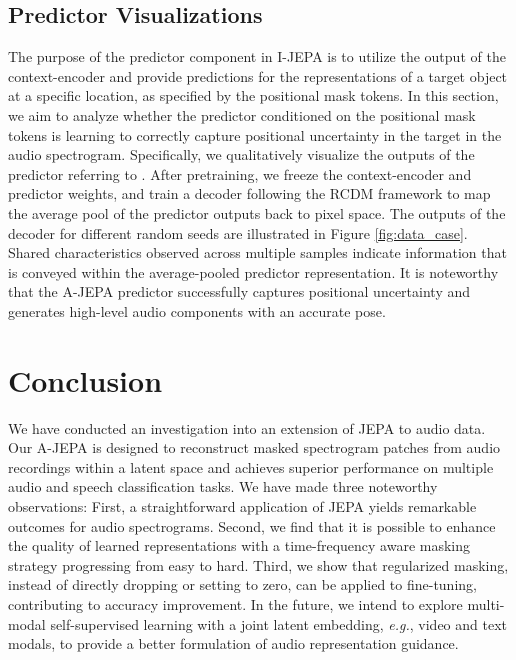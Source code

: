 \documentclass{article}
\begin{document}
\subsection{Predictor Visualizations}
The purpose of the predictor component in I-JEPA is to utilize the output of the context-encoder and provide predictions for the representations of a target object at a specific location, as specified by the positional mask tokens. In this section, we aim to analyze whether the predictor conditioned on the positional mask tokens is learning to correctly capture positional uncertainty in the target in the audio spectrogram. 
Specifically, we qualitatively visualize the outputs of the predictor referring to \cite{assran2023self}.  After pretraining, we freeze the context-encoder and predictor weights, and train a decoder following the RCDM framework \cite{bordes2021high} to map the average pool of the predictor outputs back to pixel space. The outputs of the decoder for different random seeds are illustrated in Figure \ref{fig:data_case}. 
Shared characteristics observed across multiple samples indicate information that is conveyed within the average-pooled predictor representation. It is noteworthy that the A-JEPA predictor successfully captures positional uncertainty and generates high-level audio components with an accurate pose.


\section{Conclusion}

We have conducted an investigation into an extension of JEPA to audio data. Our A-JEPA is designed to reconstruct masked spectrogram patches from audio recordings within a latent space and achieves superior performance on multiple audio and speech classification tasks. 
We have made three noteworthy observations: First, a straightforward application of JEPA yields remarkable outcomes for audio spectrograms. Second, we find that it is possible to enhance the quality of learned representations with a time-frequency aware masking strategy progressing from easy to hard. 
Third, we show that regularized masking, instead of directly dropping or setting to zero, can be applied to fine-tuning, contributing to accuracy improvement.  
In the future, we intend to explore multi-modal self-supervised learning with a joint latent embedding, \emph{e.g.}, video and text modals, to provide a better formulation of audio representation guidance. 
\end{document}
